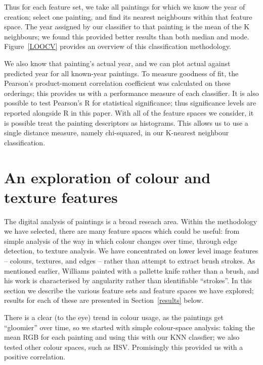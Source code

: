 \documentclass[conference,a4paper]{IEEEtran}
\begin{document}
Thus for each feature set, we take all paintings for which we know the year of
creation; select one painting, and find its nearest neighbours within that
feature space. The year assigned by our classifier to that painting is the mean
of the K neighbours; we found this provided better results than both median and
mode.  Figure~\ref{LOOCV} provides an overview of this classification
methodology.

We also know that painting's actual year, and we can plot actual against
predicted year for all known-year paintings.  To measure goodness of fit, the
Pearson's product-moment correlation coefficient was calculated on these
orderings; this provides us with a performance measure of each classifier.  It
is also possible to test Pearson's R for statistical significance; thus
significance levels are reported alongside R in this paper.  With all of the
feature spaces we consider, it is possible treat the painting descriptors as
histograms.  This allows us to use a single distance measure, namely
chi-squared, in our K-nearest neighbour classification.

\section{An exploration of colour and texture features}


The digital analysis of paintings is a broad reseach area. Within the
methodology we have selected, there are many feature spaces which could be
useful: from simple analysis of the way in which colour changes over time,
through edge detection, to texture analysis. We have concentrated on lower
level image features -- colours, textures, and edges -- rather than attempt to
extract brush strokes. As mentioned earlier, Williams painted with a pallette
knife rather than a brush, and his work is characterised by angularity rather
than identifiable ``strokes''.  In this section we describe the various feature
sets and feature spaces we have explored; results for each of these are
presented in Section~\ref{results} below.

There is a clear (to the eye) trend in colour usage, as the paintings get
``gloomier'' over time, so we started with simple colour-space analysis: taking
the mean RGB for each painting and using this with our KNN classfier; we also
tested other colour spaces, such as HSV. Promisingly this provided us with a
positive correlation. 
 
\end{document}
